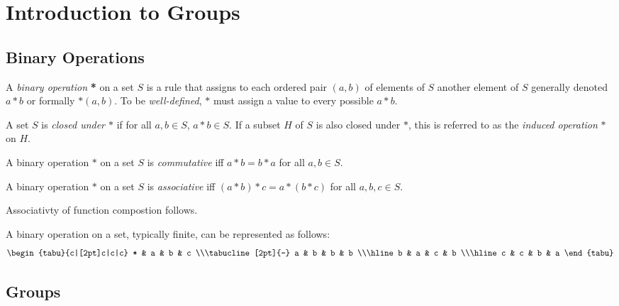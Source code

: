 \chapter{Introduction to Groups}

\section{Binary Operations}
    
\begin{definition}
    A \textit{binary operation} \textbf{*} on a set $S$ is a rule that assigns to each ordered pair $(a,b)$ of elements of $S$ another element of $S$ generally denoted $a*b$ or formally $*(a,b)$. To be \emph{well-defined}, $*$ must assign a value to every possible $a*b$.
\end{definition}
\begin{definition}
    A set $S$ is \emph{closed under $*$} if for all $a,b \in S$, $a*b \in S$. If a subset $H$ of $S$ is also closed under $*$, this is referred to as the \emph{induced operation} $*$ on $H$.
\end{definition}
\begin{definition}
    A binary operation $*$ on a set $S$ is \textit{commutative} iff $a*b = b*a$ for all $a,b \in S$.
\end{definition}
\begin{definition}
    A binary operation $*$ on a set $S$ is \textit{associative} iff $(a*b)*c = a*(b*c)$ for all $a,b,c \in S$.
\end{definition}
\begin{note}
    Associativty of function compostion follows.
\end{note}
\begin{remark}
    A binary operation on a set, typically finite, can be represented as follows:
    \[ 
        \renewcommand\arraystretch{1.2}
        \begin{tabu}{c|[2pt]c|c|c}
            * & a & b & c \\\tabucline[2pt]{-}
            a & b & b & b \\\hline
            b & a & c & b \\\hline
            c & c & b & a
        \end{tabu}
    \]
\end{remark}

\section{Groups}


